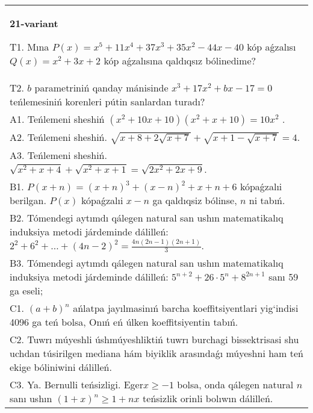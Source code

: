 \documentclass{article}
\begin{document}
\begin{tabular}{m{17cm}}
\textbf{21-variant}
\newline

T1. Mına \(P(x) = x^{5} + 11x^{4} + 37x^{3} + 35x^{2} - 44x - 40\) kóp aǵzalısı \(Q(x) = x^{2} + 3x + 2\) kóp aǵzalısına qaldıqsız bólinedime? \\
T2. \(b\) parametriniń qanday mánisinde \(x^{3} + 17x^{2} + bx - 17 = 0\) teńlemesiniń korenleri pútin sanlardan turadı? \\
A1. Teńlemeni sheshiń \(\left( x^{2} + 10x + 10 \right)\left( x^{2} + x + 10 \right) = 10x^{2}\) . \\
A2. Teńlemeni sheshiń. \(\sqrt{x + 8 + 2\sqrt{x + 7}} + \sqrt{x + 1 - \sqrt{x + 7}} = 4\). \\
A3. Teńlemeni sheshiń. \(\sqrt{x^{2} + x + 4} + \sqrt{x^{2} + x + 1} = \sqrt{2x^{2} + 2x + 9}\). \\
B1. \(P(x + n) = (x + n)^{3} + (x - n)^{2} + x + n + 6\) kópaǵzalıi berilgan. \(P(x)\) kópaǵzalıi \(x - n\) ga qaldıqsiz bólinse, \(n\) ni tabıń. \\
B2. Tómendegi aytımdı qálegen natural san ushın matematikalıq induksiya metodi járdeminde dálilleń: \(2^{2} + 6^{2} + \ldots + (4n - 2)^{2} = \frac{4n(2n - 1)(2n + 1)}{3}\). \\
B3. Tómendegi aytımdı qálegen natural san ushın matematikalıq induksiya metodi járdeminde dálilleń: \(5^{n + 2} + 26 \cdot 5^{n} + 8^{2n + 1}\) sanı 59 ga eseli; \\
C1. \((a + b)^{n}\) ańlatpa jayılmasinıń barcha koeffitsiyentlari yig`indisi 4096 ga teń bolsa, Onıń eń úlken koeffitsiyentin tabıń. \\
C2. Tuwrı múyeshli úshmúyeshliktiń tuwrı burchagi bissektrisasi shu uchdan túsirilgen mediana hám biyiklik arasındaǵı múyeshni ham teń ekige bóliniwini dálilleń. \\
C3. Ya. Bernulli teńsizligi. Eger\(x \geq - 1\) bolsa, onda qálegen natural \(n\) sanı ushın \((1 + x)^{n} \geq 1 + nx\) teńsizlik orinli bolıwın dálilleń. \\

\end{tabular}
\vspace{1cm}
\end{document}
